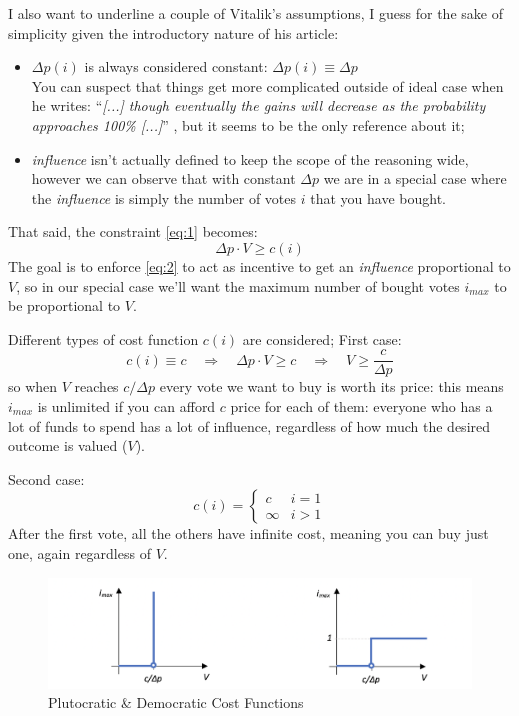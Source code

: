 \documentclass[10pt,a4paper]{article}
\begin{document}
	I also want to underline a couple of Vitalik’s assumptions, I guess for the sake of simplicity given the introductory nature of his article:
	\begin{itemize}
		\item $\Delta p(i)$ is always considered constant: $\Delta p(i) \equiv \Delta p$\\
		You can suspect that things get more complicated outside of ideal case when he writes: \enquote{\textit{[...] though eventually the gains will decrease as the probability approaches 100\% [...]}} , but it seems to be the only reference about it;
		\item \textit{influence} isn’t actually defined to keep the scope of the reasoning wide, however we can observe that with constant $\Delta p$ we are in a special case where the \textit{influence} is simply the number of votes $i$ that you have bought.
	\end{itemize}
	That said, the constraint \ref{eq:1} becomes:
	\begin{equation}\label{eq:2}
		\Delta p \cdot V \geq c(i)
	\end{equation}
	The goal is to enforce \ref{eq:2} to act as incentive to get an \textit{influence} proportional to $V$, so in our special case we’ll want the maximum number of bought votes $i_{max}$ to be proportional to $V$.
	
	Different types of cost function $c(i)$ are considered; First case:
	\begin{equation*}
		c(i) \equiv c \quad \Longrightarrow \quad \Delta p \cdot V \geq c \quad \Longrightarrow \quad V \geq \frac{c}{\Delta p}
	\end{equation*}
	so when $V$ reaches $c/\Delta p$ every vote we want to buy is worth its price: this means $i_{max}$ is unlimited if you can afford $c$ price for each of them: everyone who has a lot of funds to spend has a lot of influence, regardless of how much the desired outcome is valued ($V$).
	
	Second case:
	\begin{equation*}
		c(i)=
		\begin{cases}
			c & i = 1\\
			\infty & i > 1
		\end{cases}
	\end{equation*}
	After the first vote, all the others have infinite cost, meaning you can buy just one, again regardless of $V$.
	\begin{figure}
		\includegraphics[width=\linewidth]{FIG/prequadratic.png}
		\caption{Plutocratic \& Democratic Cost Functions}
		\label{fig:prequadratic}
	\end{figure}
\end{document}

